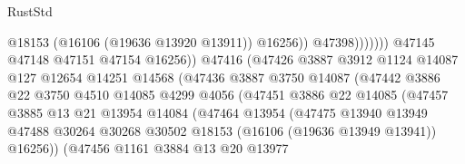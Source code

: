 \begin{lexlean}{RustStd}
\begin{coremodule}
                                                  @18153
                                                  (@16106 (@19636 @13920 @13911))
                                                  @16256))
                                              @47398)))))))
                                @47145
                                @47148
                                @47151
                                @47154
                                @16256))
                            @47416
                            (@47426
                              @3887
                              @3912
                              @1124
                              @14087
                              @127
                              @12654
                              @14251
                              @14568
                              (@47436
                                @3887
                                @3750
                                @14087
                                (@47442
                                  @3886
                                  @22
                                  @3750
                                  @4510
                                  @14085
                                  @4299
                                  @4056
                                  (@47451
                                    @3886
                                    @22
                                    @14085
                                    (@47457
                                      @3885
                                      @13
                                      @21
                                      @13954
                                      @14084
                                      (@47464
                                        @13954
                                        (@47475
                                          @13940
                                          @13949
                                          @47488
                                          @30264
                                          @30268
                                          @30502
                                          @18153
                                          (@16106 (@19636 @13949 @13941))
                                          @16256))
                                      (@47456
                                        @1161
                                        @3884
                                        @13
                                        @20
                                        @13977

\end{coremodule}
\end{lexlean}
